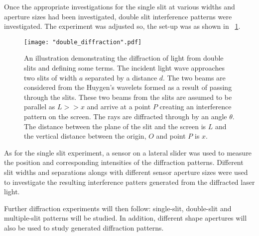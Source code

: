\documentclass{article}
\newcommand{\figref}[2][\figurename~]{#1\ref{#2}}
\begin{document}
\newpage
\vspace{2mm}
\noindent
Once the appropriate investigations for the single slit at various widths and aperture sizes had been investigated, double slit interference patterns were investigated. The experiment was adjusted so, the set-up was as shown in \figref{fig:double_diffraction}.

\begin{figure}[h]
\centering
\texttt{[image: "double\_diffraction".pdf]}
\caption{An illustration demonstrating the diffraction of light from double slits and defining some terms. The incident light wave approaches two slits of width $a$ separated by a distance $d$. The two beams are considered from the Huygen's wavelets \cite{Book01} formed as a result of passing through the slits. These two beams from the slits are assumed to be parallel as $L >> x$ and arrive at a point $P$ creating an interference pattern on the screen. The rays are diffracted through by an angle $\theta$. The distance between the plane of the slit and the screen is $L$ and the vertical distance between the origin, $O$ and point $P$ is $x$.}
\label{fig:double_diffraction}
\end{figure}

\vspace{2mm}
\noindent
As for the single slit experiment, a sensor on a lateral slider was used to measure the position and corresponding intensities of the diffraction patterns. Different slit widths and separations alongs with different sensor aperture sizes were used to investigate the resulting interference patters generated from the diffracted laser light.

\vspace{2mm}
\noindent
Further diffraction experiments will then follow: single-slit, double-slit and multiple-slit patterns will be studied. In addition, different shape apertures will also be used to study generated diffraction patterns.   






\end{document}
